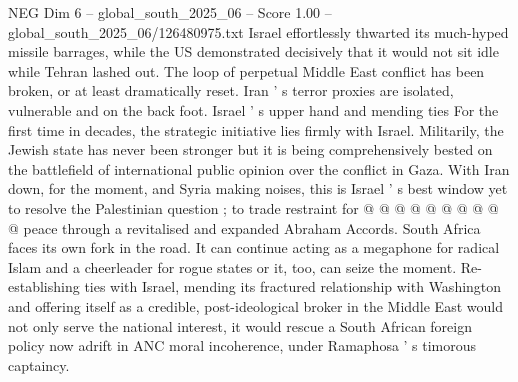 \begin{textsample}{NEG Dim 6 – global\_south\_2025\_06 – Score 1.00 – global\_south\_2025\_06/126480975.txt}
Israel effortlessly thwarted its much-hyped missile barrages, while the US demonstrated decisively that it would not sit idle while Tehran lashed out.
The loop of perpetual Middle East conflict has been broken, or at least dramatically reset.
Iran ' s terror proxies are isolated, vulnerable and on the back foot.
Israel ' s upper hand and mending ties For the first time in decades, the strategic initiative lies firmly with Israel.
Militarily, the Jewish state has never been stronger but it is being comprehensively bested on the battlefield of international public opinion over the conflict in Gaza.
With Iran down, for the moment, and Syria making noises, this is Israel ' s best window yet to resolve the Palestinian question ; to trade restraint for @ @ @ @ @ @ @ @ @ @ peace through a revitalised and expanded Abraham Accords.
South Africa faces its own fork in the road.
It can continue acting as a megaphone for radical Islam and a cheerleader for rogue states or it, too, can seize the moment.
Re-establishing ties with Israel, mending its fractured relationship with Washington and offering itself as a credible, post-ideological broker in the Middle East would not only serve the national interest, it would rescue a South African foreign policy now adrift in ANC moral incoherence, under Ramaphosa ' s timorous captaincy.

\end{textsample}
